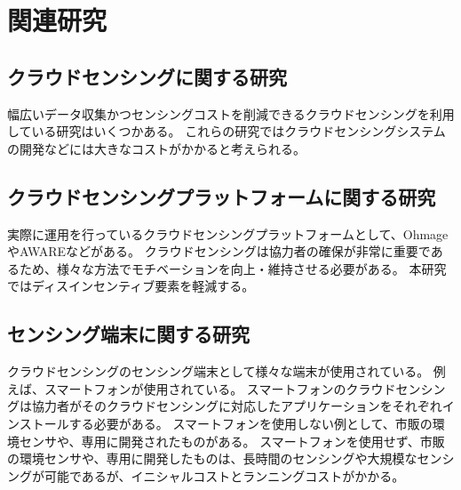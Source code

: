 \thispagestyle{myheadings}
\chapter{関連研究}
\label{sec:format}


\section{クラウドセンシングに関する研究}
\label{sec:format_thesis}
幅広いデータ収集かつセンシングコストを削減できるクラウドセンシングを利用している研究はいくつかある。
これらの研究ではクラウドセンシングシステムの開発などには大きなコストがかかると考えられる。


\section{クラウドセンシングプラットフォームに関する研究}
\label{sec:style}
実際に運用を行っているクラウドセンシングプラットフォームとして、OhmageやAWAREなどがある。
クラウドセンシングは協力者の確保が非常に重要であるため、様々な方法でモチベーションを向上・維持させる必要がある。
本研究ではディスインセンティブ要素を軽減する。


\section{センシング端末に関する研究}
\label{sec:format_abst}
クラウドセンシングのセンシング端末として様々な端末が使用されている。
例えば、スマートフォンが使用されている。
スマートフォンのクラウドセンシングは協力者がそのクラウドセンシングに対応したアプリケーションをそれぞれインストールする必要がある。
スマートフォンを使用しない例として、市販の環境センサや、専用に開発されたものがある。
スマートフォンを使用せず、市販の環境センサや、専用に開発したものは、長時間のセンシングや大規模なセンシングが可能であるが、イニシャルコストとランニングコストがかかる。

